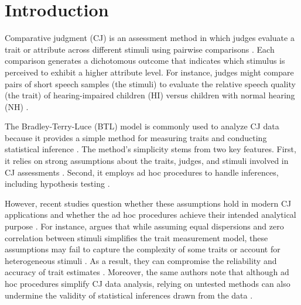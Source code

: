 \documentclass[
  authoryear,
  review,
  1p]{elsarticle}
\begin{document}
\newcommand{\dsep}{\:\bot\:}
\newcommand{\ndsep}{\:\not\bot\:}

\section{Introduction}\label{sec-introduction}

Comparative judgment (CJ) is an assessment method in which judges
evaluate a trait or attribute across different stimuli using pairwise
comparisons \citep{Thurstone_1927a, Thurstone_1927b}. Each comparison
generates a dichotomous outcome that indicates which stimulus is
perceived to exhibit a higher attribute level. For instance, judges
might compare pairs of short speech samples (the stimuli) to evaluate
the relative speech quality (the trait) of hearing-impaired children
(HI) versus children with normal hearing (NH) \citep{Boonen_et_al_2020}.

The Bradley-Terry-Luce (BTL) model \citep{Bradley_et_al_1952, Luce_1959}
is commonly used to analyze CJ data because it provides a simple method
for measuring traits and conducting statistical inference
\citep{Andrich_1978, Pollitt_2012b}. The method's simplicity stems from
two key features. First, it relies on strong assumptions about the
traits, judges, and stimuli involved in CJ assessments
\citep{Thurstone_1927b, Bramley_2008}. Second, it employs ad hoc
procedures to handle inferences, including hypothesis testing
\citep{Pollitt_2012b}.

However, recent studies question whether these assumptions hold in
modern CJ applications
\citep{Bramley_2008, Kelly_et_al_2022, Rivera_et_al_2025} and whether
the ad hoc procedures achieve their intended analytical purpose
\citep{Kelly_et_al_2022, Rivera_et_al_2025}. For instance,
\citet[pp.~2]{Rivera_et_al_2025} argues that while assuming equal
dispersions and zero correlation between stimuli simplifies the trait
measurement model, these assumptions may fail to capture the complexity
of some traits or account for heterogeneous stimuli
\citep{Thurstone_1927a, Andrich_1978, vanDaal_et_al_2016, Lesterhuis_et_al_2018, Chambers_et_al_2022}.
As a result, they can compromise the reliability and accuracy of trait
estimates
\citep{Ackerman_1989, Zimmerman_1994, McElreath_2020, Wu_et_al_2022, Miller_2023, Hoyle_et_al_2023}.
Moreover, the same authors note that although ad hoc procedures simplify
CJ data analysis, relying on untested methods can also undermine the
validity of statistical inferences drawn from the data
\citep{McElreath_2020, Kline_et_al_2023, Hoyle_et_al_2023}.
\end{document}
